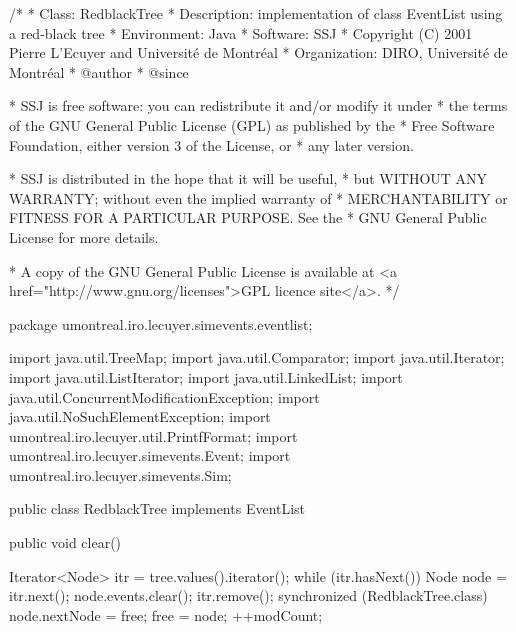 \begin{code}
\begin{hide}
/*
 * Class:        RedblackTree
 * Description:  implementation of class EventList using a red-black tree
 * Environment:  Java
 * Software:     SSJ 
 * Copyright (C) 2001  Pierre L'Ecuyer and Université de Montréal
 * Organization: DIRO, Université de Montréal
 * @author       
 * @since

 * SSJ is free software: you can redistribute it and/or modify it under
 * the terms of the GNU General Public License (GPL) as published by the
 * Free Software Foundation, either version 3 of the License, or
 * any later version.

 * SSJ is distributed in the hope that it will be useful,
 * but WITHOUT ANY WARRANTY; without even the implied warranty of
 * MERCHANTABILITY or FITNESS FOR A PARTICULAR PURPOSE.  See the
 * GNU General Public License for more details.

 * A copy of the GNU General Public License is available at
   <a href="http://www.gnu.org/licenses">GPL licence site</a>.
 */
\end{hide}
package umontreal.iro.lecuyer.simevents.eventlist;\begin{hide}

import java.util.TreeMap;
import java.util.Comparator;
import java.util.Iterator;
import java.util.ListIterator;
import java.util.LinkedList;
import java.util.ConcurrentModificationException;
import java.util.NoSuchElementException;
import umontreal.iro.lecuyer.util.PrintfFormat;
import umontreal.iro.lecuyer.simevents.Event;
import umontreal.iro.lecuyer.simevents.Sim;
\end{hide}

public class RedblackTree implements EventList\begin{hide} {
   private TreeMap<Event, Node> tree = new TreeMap<Event, Node>(new EventComparator());
   private static Node free = null;
   private int modCount = 0;\end{hide}
\end{code}\begin{hide}\begin{code}

   public void clear()\begin{hide} {
      Iterator<Node> itr = tree.values().iterator();
      while (itr.hasNext()) {
         Node node = itr.next();
         node.events.clear();
         itr.remove();
         synchronized (RedblackTree.class) {
            node.nextNode = free;
            free = node;
         }
      }
      ++modCount;
   }\end{hide}


\end{code}
\end{hide}
